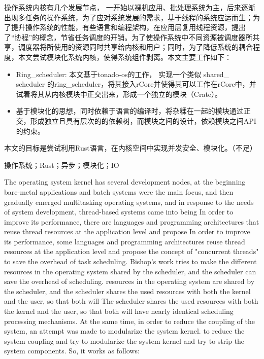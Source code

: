\setlength{\headheight}{1.5cm}

\abstractcn


操作系统内核有几个发展节点， 一开始以裸机应用、批处理系统为主，后来逐渐出现多任务的操作系统，为了应对系统发展的需求，基于线程的系统应运而生；为了提升操作系统的性能，有些语言和编程架构，在应用层复用线程资源，提出了“协程”的概念，节省任务调度的开销。为了使操作系统中不同资源被调度器所共享，调度器将所使用的资源同时共享给内核和用户；同时，为了降低系统的耦合程度，本文尝试模块化系统内核，使得系统组件剥离。本文主要工作如下：

\begin{itemize}
\item Ring\_scheduler: 本文基于tonado-os的工作， 实现一个类似 shared\_ scheduler 的ring\_scheduler，将其接入rCore并使得其可以工作在rCore中，并试着将其从内核模块中正交出来，形成一个独立的模块（Crate）。 

\item 基于模块化的思想，同时依赖于语言的编译时，将杂糅在一起的模块通过正交，形成独立且具有层次的的依赖树，而模块之间的设计，依赖模块之间API的约束。
\end{itemize}


本文的目标是尝试利用Rust语言，在内核空间中实现并发安全、模块化。（不足）

\keywordscn\quad 操作系统；Rust；异步；模块化；IO
\abstracten

The operating system kernel has several development nodes, at the beginning bare-metal applications and batch systems were the main focus, and then gradually emerged multitasking operating systems, and in response to the needs of system development, thread-based systems came into being In order to improve its performance, there are languages and programming architectures that reuse thread resources at the application level and propose In order to improve its performance, some languages and programming architectures reuse thread resources at the application level and propose the concept of "concurrent threads" to save the overhead of task scheduling. Bishop's work tries to make the different resources in the operating system shared by the scheduler, and the scheduler can save the overhead of scheduling. resources in the operating system are shared by the scheduler, and the scheduler shares the used resources with both the kernel and the user, so that both will The scheduler shares the used resources with both the kernel and the user, so that both will have nearly identical scheduling processing mechanisms. At the same time, in order to reduce the coupling of the system, an attempt was made to modularize the system kernel. to reduce the system coupling and try to modularize the system kernel and try to strip the system components. So, it works as follows:

